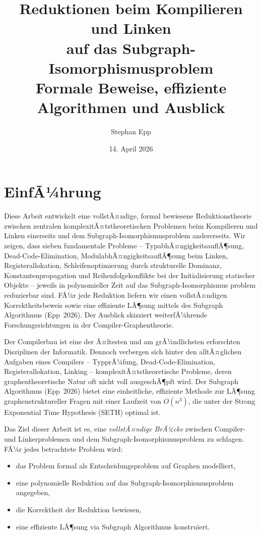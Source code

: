 ﻿\documentclass[a4paper,12pt]{article}
\title{\textbf{Reduktionen beim Kompilieren und Linken\\
auf das Subgraph-Isomorphismusproblem}\\[0.1em]
\large Formale Beweise, effiziente Algorithmen und Ausblick}
\author{Stephan Epp}
\date{14. April 2026}
\theoremstyle{definition}
\begin{document}
\maketitle

\tableofcontents
\newpage

\section{EinfÃ¼hrung}
Diese Arbeit entwickelt eine vollstÃ¤ndige, formal bewiesene Reduktionstheorie zwischen zentralen komplexitÃ¤tstheoretischen Problemen beim Kompilieren und Linken einerseits und dem Subgraph-Isomorphismusproblem andererseits. Wir zeigen, dass sieben fundamentale Probleme -- TypabhÃ¤ngigkeitsauflÃ¶sung, Dead-Code-Elimination, ModulabhÃ¤ngigkeitsauf\-lÃ¶sung beim Linken, Registerallokation, Schleifenoptimierung durch strukturelle Dominanz, Konstantenpropagation und Reihenfolgekonflikte bei der Initialisierung statischer Objekte -- jeweils in polynomieller Zeit auf das Subgraph-Isomorphismus\- problem reduzierbar sind. FÃ¼r jede Reduktion liefern wir einen vollstÃ¤ndigen Korrektheitsbeweis sowie eine effiziente LÃ¶sung mittels des Subgraph Algorithmus (Epp~2026). Der Ausblick skizziert weiterfÃ¼hrende Forschungsrichtungen in der Compiler-Graphentheorie.

Der Compilerbau ist eine der Ã¤ltesten und am grÃ¼ndlichsten erforschten Disziplinen der Informatik. Dennoch verbergen sich hinter den alltÃ¤glichen Aufgaben eines Compilers -- TypprÃ¼fung, Dead-Code-Elimination, Registerallokation, Linking -- komplexitÃ¤tstheoretische Probleme, deren graphentheoretische Natur oft nicht voll ausgeschÃ¶pft wird. Der Subgraph Algorithmus (Epp~2026) bietet eine einheitliche, effiziente Methode zur LÃ¶sung graphenstruktureller Fragen mit einer Laufzeit von $O(n^3)$, die unter der Strong Exponential Time Hypothesis (SETH) optimal ist.

Das Ziel dieser Arbeit ist es, eine \emph{vollstÃ¤ndige BrÃ¼cke} zwischen Compiler- und Linkerproblemen und dem Subgraph-Isomorphismusproblem zu schlagen. FÃ¼r jedes betrachtete Problem wird:
\begin{itemize}
    \item das Problem formal als Entscheidungsproblem auf Graphen modelliert,
    \item eine polynomielle Reduktion auf das Subgraph-Isomorphismusproblem angegeben,
    \item die Korrektheit der Reduktion bewiesen,
    \item eine effiziente LÃ¶sung via Subgraph Algorithmus konstruiert.
\end{itemize}
\end{document}
